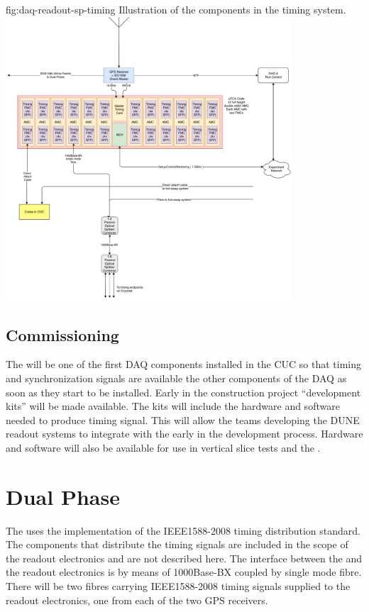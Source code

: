\documentclass[final]{dune}
\begin{document}
\begin{dunefigure}{fig:daq-readout-sp-timing}
  {Illustration of the components in the \single timing system.}
  \includegraphics[width=0.8\textwidth]{DUNE_SP_Timing_1nov18.pdf}
\end{dunefigure}

\subsection{Commissioning}

The  will be one of the first DAQ components installed in the CUC so that timing and synchronization signals are available the other components of the DAQ as soon as they start to be installed. Early in the construction project  ``development kits'' will be made available. The kits will include the hardware and software needed to produce  timing signal. This will allow the teams developing the DUNE readout systems to integrate with the  early in the development process. Hardware and software will also be available for use in vertical slice tests and the . 

\section{Dual Phase}

The  uses the  implementation of the IEEE1588-2008 timing distribution standard. The components that distribute the timing signals are included in the scope of the  readout electronics and are not described here. The interface between the  and the  readout electronics is by means of 1000Base-BX  coupled by single mode fibre. There will be two fibres carrying IEEE1588-2008 timing signals supplied to the  readout electronics, one from each of the two GPS receivers.


\end{document}
